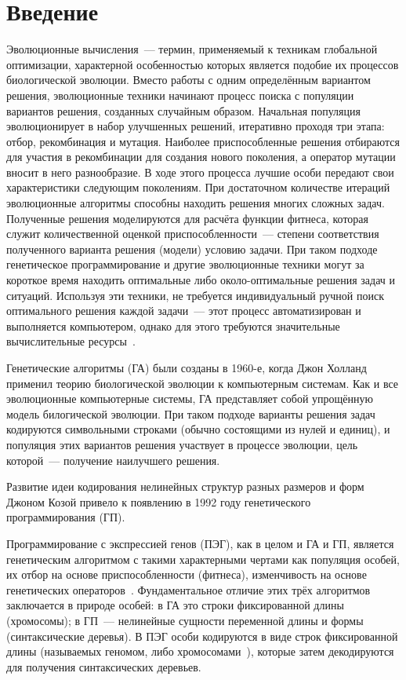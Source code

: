 \section*{Введение}

Эволюционные вычисления~--- термин, применяемый к техникам глобальной оптимизации, характерной особенностью которых является подобие их процессов биологической эволюции. Вместо работы с одним определённым вариантом решения, эволюционные техники начинают процесс поиска с популяции вариантов решения, созданных случайным образом. Начальная популяция эволюционирует в набор улучшенных решений, итеративно проходя три этапа: отбор, рекомбинация и мутация. Наиболее приспособленные решения отбираются для участия в рекомбинации для создания нового поколения, а оператор мутации вносит в него разнообразие. В ходе этого процесса лучшие особи передают свои характеристики следующим поколениям. При достаточном количестве итераций эволюционные алгоритмы способны находить решения многих сложных задач.
Полученные решения моделируются для расчёта функции фитнеса, которая служит количественной оценкой приспособленности~--- степени соответствия полученного варианта решения (модели) условию задачи. При таком подходе генетическое программирование и другие эволюционные техники могут за короткое время находить оптимальные либо около-оптимальные решения задач и ситуаций. Используя эти техники, не требуется индивидуальный ручной поиск оптимального решения каждой задачи~--- этот процесс автоматизирован и выполняется компьютером, однако для этого требуются значительные вычислительные ресурсы~\cite{Nunez:2006:msoec}.

Генетические алгоритмы (ГА) были созданы в 1960-е, когда Джон Холланд применил теорию биологической эволюции к компьютерным системам. Как и все эволюционные компьютерные системы, ГА представляет собой упрощённую модель билогической эволюции. При таком подходе варианты решения задач кодируются символьными строками (обычно состоящими из нулей и единиц), и популяция этих вариантов решения участвует в процессе эволюции, цель которой~--- получение наилучшего решения.

Развитие идеи кодирования нелинейных структур разных размеров и форм Джоном Козой привело к появлению в 1992 году генетического программирования (ГП).

Программирование с экспрессией генов (ПЭГ), как в целом и ГА и ГП, является генетическим алгоритмом с такими характерными чертами как популяция особей, их отбор на основе приспособленности (фитнеса), изменчивость на основе генетических операторов~\cite{Ferreira2001}. Фундаментальное отличие этих трёх алгоритмов заключается в природе особей: в ГА это строки фиксированной длины (хромосомы); в ГП~--- нелинейные сущности переменной длины и формы (синтаксические деревья). В ПЭГ особи кодируются в виде строк фиксированной длины (называемых геномом, либо хромосомами~\cite{ferreira:2001:wsc6Aa}), которые затем декодируются для получения синтаксических деревьев.

